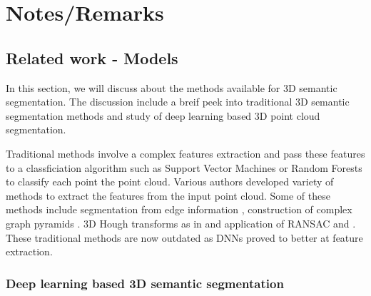 

\chapter{Notes/Remarks}
\section{Related work - Models}

In this section, we will discuss about the methods available for 3D semantic segmentation.
The discussion include a breif peek into traditional 3D semantic segmentation methods and study of deep learning based 3D point cloud segmentation.

Traditional methods involve a complex features extraction and pass these features to a classficiation algorithm such as Support Vector Machines or Random Forests to classify each point the point cloud.
Various authors developed variety of methods to extract the features from the input point cloud.
Some of these methods include segmentation from edge information \cite{bhanu1986range}, construction of complex graph pyramids \cite{koster}.
3D Hough transforms as in \cite{vosselman20013d} and application of RANSAC \cite{schnabel2007efficient} and \cite{tarsha2007hough}.
These traditional methods are now outdated as DNNs proved to better at feature extraction.

\subsection{Deep learning based 3D semantic segmentation}


